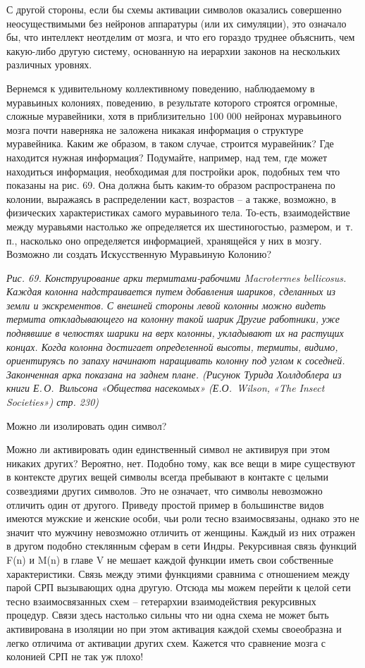 \documentclass[../main.tex]{subfiles}
\begin{document}
С другой стороны, если бы схемы активации символов оказались совершенно неосуществимыми без нейронов аппаратуры (или их симуляции), это означало бы, что интеллект неотделим от мозга, и что его гораздо труднее объяснить, чем какую-либо другую систему, основанную на иерархии законов на нескольких различных уровнях.

Вернемся к удивительному коллективному поведению, наблюдаемому в муравьиных колониях, поведению, в результате которого строятся огромные, сложные муравейники, хотя в приблизительно 100 000 нейронах муравьиного мозга почти наверняка не заложена никакая информация о структуре муравейника. Каким же образом, в таком случае, строится муравейник? Где находится нужная информация? Подумайте, например, над тем, где может находиться информация, необходимая для постройки арок, подобных тем что показаны на рис. 69. Она должна быть каким-то образом распространена по колонии, выражаясь в распределении каст, возрастов \--- а также, возможно, в физических характеристиках самого муравьиного тела. То-есть, взаимодействие между муравьями настолько же определяется их шестиногостью, размером, и~т.\,п., насколько оно определяется информацией, хранящейся у них в мозгу. Возможно ли создать Искусственную Муравьиную Колонию?

\emph{Рис. 69. Конструирование арки термитами-рабочими Macrotermes bellicosus. Каждая колонна надстраивается путем добавления шариков, сделанных из земли и экскрементов. С внешней стороны левой колонны можно видеть термита откладывающего на колонну такой шарик Другие работники, уже поднявшие в челюстях шарики на верх колонны, укладывают их на растущих концах. Когда колонна достигает определенной высоты, термиты, видимо, ориентируясь по запаху начинают наращивать колонну под углом к соседней. Законченная арка показана на заднем плане. (Рисунок Турида Холлдоблера из книги Е.\,О.~Вильсона «Общества насекомых» (Е.О.~Wilson, «The Insect Societies») стр. 230)}

Можно ли изолировать один символ?

Можно ли активировать один единственный символ не активируя при этом никаких других? Вероятно, нет. Подобно тому, как все вещи в мире существуют в контексте других вещей символы всегда пребывают в контакте с целыми созвездиями других символов. Это не означает, что символы невозможно отличить один от другого. Приведу простой пример в большинстве видов имеются мужские и женские особи, чьи роли тесно взаимосвязаны, однако это не значит что мужчину невозможно отличить от женщины. Каждый из них отражен в другом подобно стеклянным сферам в сети Индры. Рекурсивная связь функций F(n) и M(n) в главе V не мешает каждой функции иметь свои собственные характеристики. Связь между этими функциями сравнима с отношением между парой СРП вызывающих одна другую. Отсюда мы можем перейти к целой сети тесно взаимосвязанных схем \--- гетерархии взаимодействия рекурсивных процедур. Связи здесь настолько сильны что ни одна схема не может быть активирована в изоляции но при этом активация каждой схемы своеобразна и легко отличима от активации других схем. Кажется что сравнение мозга с колонией СРП не так уж плохо!
\end{document}
